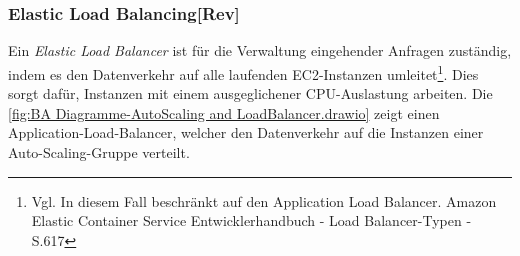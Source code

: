 \\\\
\subsubsection*{Elastic Load Balancing[Rev]}%
Ein \textit{Elastic Load Balancer} ist für die Verwaltung eingehender Anfragen zuständig, indem es den Datenverkehr auf alle laufenden EC2-Instanzen umleitet\footnote{Vgl. In diesem Fall beschränkt auf den Application Load Balancer. Amazon Elastic Container Service Entwicklerhandbuch - Load Balancer-Typen - S.617\cite{AMZ39}}. Dies sorgt dafür, Instanzen mit einem ausgeglichener CPU-Auslastung arbeiten. Die \autoref{fig:BA Diagramme-AutoScaling and LoadBalancer.drawio} zeigt einen Application-Load-Balancer, welcher den Datenverkehr auf die Instanzen einer Auto-Scaling-Gruppe verteilt.

